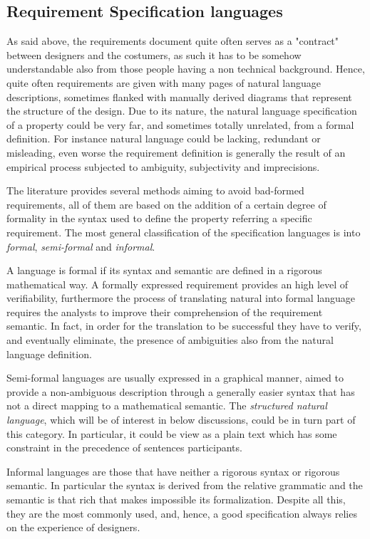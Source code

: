\subsection{Requirement Specification languages}
As said above, the requirements document quite often serves as a "contract" between designers and the costumers, as such it has to be somehow understandable also from those people having a non technical background. Hence, quite often requirements are given with many pages of natural language descriptions, sometimes flanked with manually derived diagrams that represent the structure of the design. Due to its nature, the natural language specification of a property could be very far, and sometimes totally unrelated, from a formal definition. For instance natural language could be lacking, redundant or misleading, even worse the requirement definition is generally the result of an empirical process subjected to ambiguity, subjectivity and imprecisions.
\par The literature provides several methods aiming to avoid bad-formed requirements, all of them are based on the addition of a certain degree of formality in the syntax used to define the property referring a specific requirement. The most general classification of the specification languages is into \textit{formal}, \textit{semi-formal} and \textit{informal}.
\par A language is formal if its syntax and semantic are defined in a rigorous mathematical way. A formally expressed requirement provides an high level of verifiability, furthermore the process of translating natural into formal language requires the analysts to improve their comprehension of the requirement semantic. In fact, in order for the translation to be successful they have to verify, and eventually eliminate, the presence of ambiguities also from the natural language definition.
\par Semi-formal languages are usually expressed in a graphical manner, aimed to provide a non-ambiguous description through a generally easier syntax that has not a direct mapping to a mathematical semantic. The \textit{structured natural language}, which will be of interest in below discussions, could be in turn part of this category. In particular, it could be view as a plain text which has some constraint in the precedence of sentences participants.%
\par Informal languages are those that have neither a rigorous syntax or rigorous semantic. In particular the syntax is derived from the relative grammatic and the semantic is that rich that makes impossible its formalization. Despite all this, they are the most commonly used, and, hence, a good specification always relies on the experience of designers.

